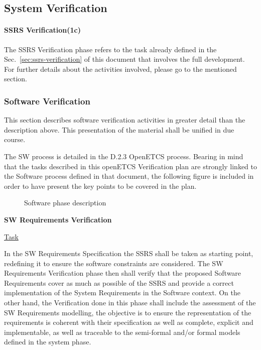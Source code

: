 
\subsection{System Verification}

\paragraph{SSRS Verification(1c)}
The SSRS Verification phase refers to the task already defined in the
Sec.~\ref{sec:ssrs-verification} of this document that involves the
full development.  For further details about the activities involved,
please go to the mentioned section.

\subsubsection{Software Verification}
\label{sec:sw-verif}

This section describes software verification activities in greater
detail than the description above. This presentation of the material
shall be unified in due course.

The SW process is detailed in the D.2.3 OpenETCS process. Bearing in
mind that the tasks described in this openETCS Verification plan are
strongly linked to the Software process defined in that document, the
following figure is included in order to have present the key points
to be covered in the plan.

\begin{figure}[h]
  \centering
  \caption{Software phase description}
  \label{fig:detailed software}
\end{figure}

\textbf{SW Requirements Verification}

\underline{Task} 

In the SW Requirements Specification the SSRS shall be taken as
starting point, redefining it to ensure the software constraints are
considered.  The SW Requirements Verification phase then shall verify
that the proposed Software Requirements cover as much as possible of
the SSRS and provide a correct implementation of the System
Requirements in the Software context.  On the other hand, the
Verification done in this phase shall include the assessment of the SW
Requirements modelling, the objective is to ensure the representation
of the requirements is coherent with their specification as well as
complete, explicit and implementable, as well as traceable to the
semi-formal and/or formal models defined in the system phase.

